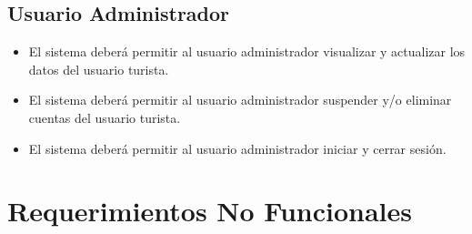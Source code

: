 \documentclass{article}
\begin{document}
\subsection{Usuario Administrador}
\begin{itemize}
    \item El sistema deberá permitir al usuario administrador visualizar y actualizar los datos del usuario turista.
    \item El sistema deberá permitir al usuario administrador suspender y/o eliminar cuentas del usuario turista.
   \item El sistema deberá permitir al usuario administrador iniciar y cerrar sesión.
 \end{itemize}

\section{Requerimientos No Funcionales}
\end{document}
